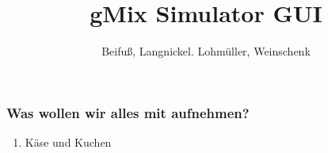 \documentclass[]{beamer}
\title{gMix Simulator GUI}
\author{Beifuß, Langnickel. Lohmüller, Weinschenk}
\begin{document}
    \frame{\titlepage}
    \frame{\tableofcontents}

\begin{frame}[t]\frametitle{Was wollen wir alles mit aufnehmen?}
    \begin{enumerate}
        \item Käse und Kuchen
    \end{enumerate}
\end{frame}
\end{document}
